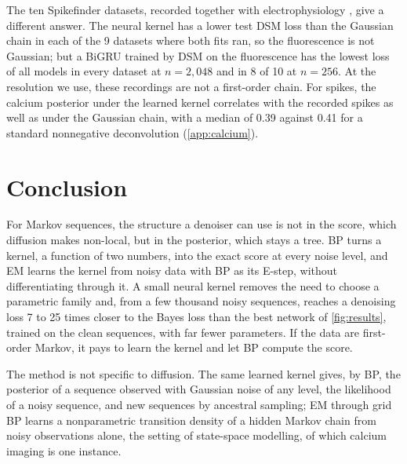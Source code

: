 \documentclass{article}
\begin{document}
The ten Spikefinder datasets, recorded together with electrophysiology \cite{berens2018community}, give a different
answer. The neural kernel has a lower test DSM loss than the Gaussian chain in each of the 9 datasets where both fits
ran, so the fluorescence is not Gaussian; but a BiGRU trained by DSM on the fluorescence has the lowest loss of all
models in every dataset at $n=2{,}048$ and in 8 of 10 at $n=256$. At the resolution we use, these recordings are not a
first-order chain. For spikes, the calcium posterior under the learned kernel correlates with the recorded spikes as
well as under the Gaussian chain, with a median of 0.39 against 0.41 for a standard nonnegative deconvolution
\cite{friedrich2017fast} (\cref{app:calcium}).

\section{Conclusion}
\label{sec:conclusion}

For Markov sequences, the structure a denoiser can use is not in the score, which diffusion makes non-local, but in the
posterior, which stays a tree. BP turns a kernel, a function of two numbers, into the exact score at every noise level,
and EM learns the kernel from noisy data with BP as its E-step, without differentiating through it. A small neural
kernel removes the need to choose a parametric family and, from a few thousand noisy sequences, reaches a denoising
loss 7 to 25 times closer to the Bayes loss than the best network of \cref{fig:results}, trained on the clean
sequences, with far fewer parameters. If the data are first-order Markov, it pays to learn the kernel and let BP compute the score.

The method is not specific to diffusion. The same learned kernel gives, by BP, the posterior of a sequence observed with
Gaussian noise of any level, the likelihood of a noisy sequence, and new sequences by ancestral sampling; EM through grid
BP learns a nonparametric transition density of a hidden Markov chain from noisy observations alone, the setting of
state-space modelling, of which calcium imaging is one instance.
\end{document}
